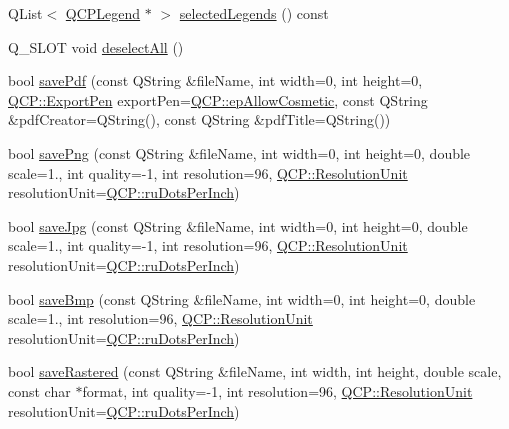 \begin{DoxyCompactItemize}
\item 
Q\+List$<$ \hyperlink{classQCPLegend}{Q\+C\+P\+Legend} $\ast$ $>$ \hyperlink{classQCustomPlot_a1ea6297300c3e2770e65f95836411755}{selected\+Legends} () const 
\item 
Q\+\_\+\+S\+L\+OT void \hyperlink{classQCustomPlot_a9d4808ab925b003054085246c92a257c}{deselect\+All} ()
\item 
bool \hyperlink{classQCustomPlot_ad5acd34f6b39c3516887d7e54fec2412}{save\+Pdf} (const Q\+String \&file\+Name, int width=0, int height=0, \hyperlink{namespaceQCP_a17844f19e1019693a953e1eb93536d2f}{Q\+C\+P\+::\+Export\+Pen} export\+Pen=\hyperlink{namespaceQCP_a17844f19e1019693a953e1eb93536d2fa50d3657dba3fb90560b93a823cb0a6e8}{Q\+C\+P\+::ep\+Allow\+Cosmetic}, const Q\+String \&pdf\+Creator=Q\+String(), const Q\+String \&pdf\+Title=Q\+String())
\item 
bool \hyperlink{classQCustomPlot_ac92cc9256d12f354b40a4be4600b5fb9}{save\+Png} (const Q\+String \&file\+Name, int width=0, int height=0, double scale=1., int quality=-\/1, int resolution=96, \hyperlink{namespaceQCP_a715d46153da230990aa887d0f0602452}{Q\+C\+P\+::\+Resolution\+Unit} resolution\+Unit=\hyperlink{namespaceQCP_a715d46153da230990aa887d0f0602452affb887d8efe79c39a1aca2acd7002afc}{Q\+C\+P\+::ru\+Dots\+Per\+Inch})
\item 
bool \hyperlink{classQCustomPlot_a76f0d278e630a711fa6f48048cfd83e4}{save\+Jpg} (const Q\+String \&file\+Name, int width=0, int height=0, double scale=1., int quality=-\/1, int resolution=96, \hyperlink{namespaceQCP_a715d46153da230990aa887d0f0602452}{Q\+C\+P\+::\+Resolution\+Unit} resolution\+Unit=\hyperlink{namespaceQCP_a715d46153da230990aa887d0f0602452affb887d8efe79c39a1aca2acd7002afc}{Q\+C\+P\+::ru\+Dots\+Per\+Inch})
\item 
bool \hyperlink{classQCustomPlot_ae3a86ed0795670e50afa21759d4fa13d}{save\+Bmp} (const Q\+String \&file\+Name, int width=0, int height=0, double scale=1., int resolution=96, \hyperlink{namespaceQCP_a715d46153da230990aa887d0f0602452}{Q\+C\+P\+::\+Resolution\+Unit} resolution\+Unit=\hyperlink{namespaceQCP_a715d46153da230990aa887d0f0602452affb887d8efe79c39a1aca2acd7002afc}{Q\+C\+P\+::ru\+Dots\+Per\+Inch})
\item 
bool \hyperlink{classQCustomPlot_ad7723ce2edfa270632ef42b03a444352}{save\+Rastered} (const Q\+String \&file\+Name, int width, int height, double scale, const char $\ast$format, int quality=-\/1, int resolution=96, \hyperlink{namespaceQCP_a715d46153da230990aa887d0f0602452}{Q\+C\+P\+::\+Resolution\+Unit} resolution\+Unit=\hyperlink{namespaceQCP_a715d46153da230990aa887d0f0602452affb887d8efe79c39a1aca2acd7002afc}{Q\+C\+P\+::ru\+Dots\+Per\+Inch})

\end{DoxyCompactItemize}
